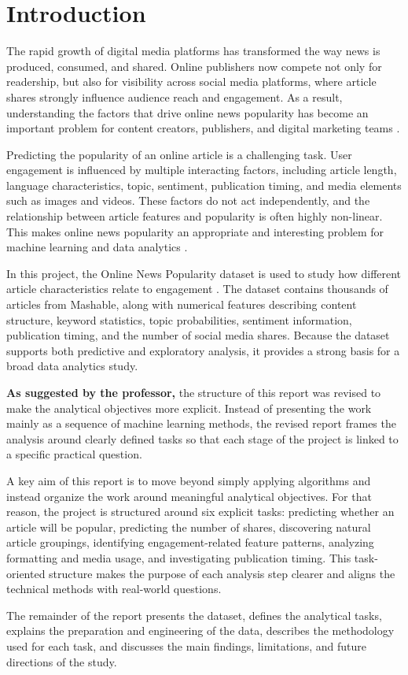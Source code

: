 \section{Introduction}

The rapid growth of digital media platforms has transformed the way news is produced, consumed, and shared. Online publishers now compete not only for readership, but also for visibility across social media platforms, where article shares strongly influence audience reach and engagement. As a result, understanding the factors that drive online news popularity has become an important problem for content creators, publishers, and digital marketing teams \cite{bishop2006prml,han2011datamining}.

Predicting the popularity of an online article is a challenging task. User engagement is influenced by multiple interacting factors, including article length, language characteristics, topic, sentiment, publication timing, and media elements such as images and videos. These factors do not act independently, and the relationship between article features and popularity is often highly non-linear. This makes online news popularity an appropriate and interesting problem for machine learning and data analytics \cite{bishop2006prml,han2011datamining}.

In this project, the Online News Popularity dataset is used to study how different article characteristics relate to engagement \cite{fernandes2015dataset}. The dataset contains thousands of articles from Mashable, along with numerical features describing content structure, keyword statistics, topic probabilities, sentiment information, publication timing, and the number of social media shares. Because the dataset supports both predictive and exploratory analysis, it provides a strong basis for a broad data analytics study.

\noindent\textbf{As suggested by the professor,} the structure of this report was revised to make the analytical objectives more explicit. Instead of presenting the work mainly as a sequence of machine learning methods, the revised report frames the analysis around clearly defined tasks so that each stage of the project is linked to a specific practical question.

A key aim of this report is to move beyond simply applying algorithms and instead organize the work around meaningful analytical objectives. For that reason, the project is structured around six explicit tasks: predicting whether an article will be popular, predicting the number of shares, discovering natural article groupings, identifying engagement-related feature patterns, analyzing formatting and media usage, and investigating publication timing. This task-oriented structure makes the purpose of each analysis step clearer and aligns the technical methods with real-world questions.

The remainder of the report presents the dataset, defines the analytical tasks, explains the preparation and engineering of the data, describes the methodology used for each task, and discusses the main findings, limitations, and future directions of the study.
